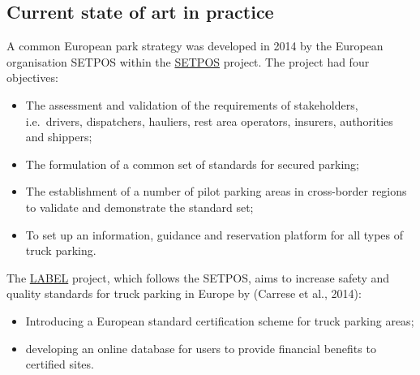 \documentclass[
]{book}
\providecommand{\tightlist}{%
  \setlength{\itemsep}{0pt}\setlength{\parskip}{0pt}}
\begin{document}
\hypertarget{current-state-of-art-in-practice-16}{%
\subsection*{Current state of art in practice}\label{current-state-of-art-in-practice-16}}

A common European park strategy was developed in 2014 by the European organisation SETPOS within the \href{https://ec.europa.eu/transport/sites/transport/files/modes/road/parking/doc/2010_04_28_setpos_project_handbook.pdf}{SETPOS} project. The project had four objectives:

\begin{itemize}
\tightlist
\item
  The assessment and validation of the requirements of stakeholders, i.e.~drivers, dispatchers, hauliers, rest area operators, insurers, authorities and shippers;
\item
  The formulation of a common set of standards for secured parking;
\item
  The establishment of a number of pilot parking areas in cross-border regions to validate and demonstrate the standard set;
\item
  To set up an information, guidance and reservation platform for all types of truck parking.
\end{itemize}

The \href{https://ec.europa.eu/transport/sites/transport/files/modes/road/parking/doc/handbook_for_labelling.pdf}{LABEL} project, which follows the SETPOS, aims to increase safety and quality standards for truck parking in Europe by (Carrese et al., 2014):

\begin{itemize}
\tightlist
\item
  Introducing a European standard certification scheme for truck parking areas;
\item
  developing an online database for users to provide financial benefits to certified sites.
\end{itemize}
\end{document}
